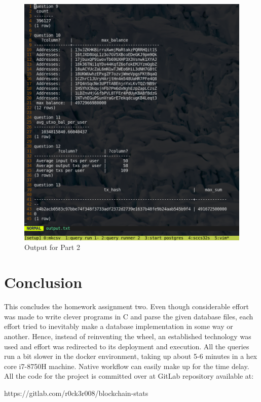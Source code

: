 \documentclass[conference,a4paper,12pt]{IEEEtran}
\begin{document}
	\begin{figure}[h!]
	  \includegraphics[width=\linewidth]{op2.png}
	  \caption{Output for Part 2}
	  \label{OP2}
	\end{figure}

\pagebreak

\section{Conclusion}
This concludes the homework assignment two. Even though considerable effort was made to write clever programs in C and parse the given database files, each effort tried to inevitably make a database implementation in some way or another. Hence, instead of reinventing the wheel, an established technology was used and effort was redirected to its deployment and execution. All the queries run a bit slower in the docker environment, taking up about 5-6 minutes in a hex core i7-8750H machine. Native workflow can easily make up for the time delay. All the code for the project is committed over at GitLab repository available at:

\begin{center}
https://gitlab.com/r0ck3r008/blockchain-stats
\end{center}
\end{document}
